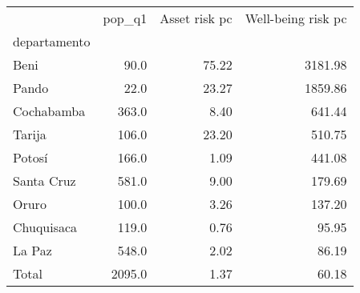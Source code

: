 \begin{tabular}{lrrr}
\toprule
{} &  pop\_q1 &  Asset risk pc &  Well-being risk pc \\
departamento &         &                &                     \\
\midrule
Beni         &    90.0 &          75.22 &             3181.98 \\
Pando        &    22.0 &          23.27 &             1859.86 \\
Cochabamba   &   363.0 &           8.40 &              641.44 \\
Tarija       &   106.0 &          23.20 &              510.75 \\
Potosí       &   166.0 &           1.09 &              441.08 \\
Santa Cruz   &   581.0 &           9.00 &              179.69 \\
Oruro        &   100.0 &           3.26 &              137.20 \\
Chuquisaca   &   119.0 &           0.76 &               95.95 \\
La Paz       &   548.0 &           2.02 &               86.19 \\
Total        &  2095.0 &           1.37 &               60.18 \\
\bottomrule
\end{tabular}
